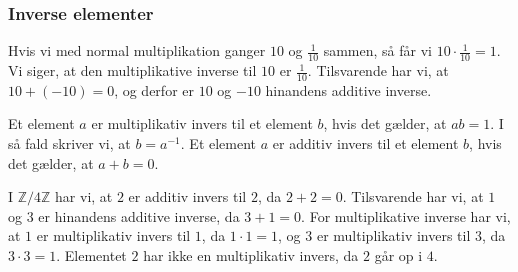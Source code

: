 \documentclass[12pt]{article}
\begin{document}
\subsubsection*{Inverse elementer}
Hvis vi med normal multiplikation ganger $10$ og $\frac{1}{10}$ sammen, så får vi $10\cdot \frac{1}{10} =1$. Vi siger, at den multiplikative inverse til $10$ er $\frac{1}{10}$. Tilsvarende har vi, at $10 + (-10) = 0$, og derfor er $10$ og $-10$ hinandens additive inverse. 
\begin{defn}
Et element $a$ er multiplikativ invers til et element $b$, hvis det gælder, at $ab = 1$. I så fald skriver vi, at $b = a^{-1}$. 
Et element $a$ er additiv invers til et element $b$, hvis det gælder, at $a+b=0$. 
\end{defn} 
\begin{exa}
I $\mathbb{Z}/4\mathbb{Z}$ har vi, at $2$ er additiv invers til $2$, da $2+2 = 0$. Tilsvarende har vi, at $1$ og $3$ er hinandens additive inverse, da $3+1 = 0$. For multiplikative inverse har vi, at $1$ er multiplikativ invers til $1$, da $1\cdot 1 = 1$, og $3$ er multiplikativ invers til $3$, da $3\cdot 3 = 1$. Elementet $2$ har ikke en multiplikativ invers, da $2$ går op i $4$.   
\end{exa}
\end{document}
